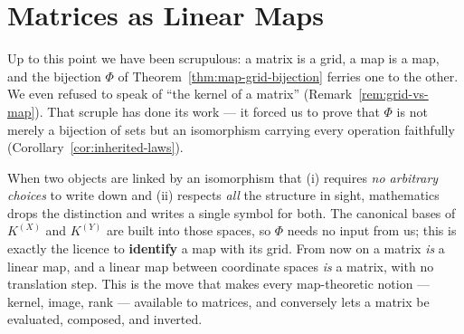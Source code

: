 
\newpage
\section{Matrices as Linear Maps}
\label{sec:matrices-as-maps}

\begin{intuition}
    Up to this point we have been scrupulous: a matrix is a grid, a map is a map, and the bijection
    $\Phi$ of Theorem~\ref{thm:map-grid-bijection} ferries one to the other. We even refused to speak of
    ``the kernel of a matrix'' (Remark~\ref{rem:grid-vs-map}). That scruple has done its work --- it
    forced us to prove that $\Phi$ is not merely a bijection of sets but an isomorphism carrying every
    operation faithfully (Corollary~\ref{cor:inherited-laws}).

    When two objects are linked by an isomorphism that (i) requires \emph{no arbitrary choices} to write
    down and (ii) respects \emph{all} the structure in sight, mathematics drops the distinction and
    writes a single symbol for both. The canonical bases of $K^{(X)}$ and $K^{(Y)}$ are built into those
    spaces, so $\Phi$ needs no input from us; this is exactly the licence to \textbf{identify} a map with
    its grid. From now on a matrix \emph{is} a linear map, and a linear map between coordinate spaces
    \emph{is} a matrix, with no translation step. This is the move that makes every map-theoretic notion
    --- kernel, image, rank --- available to matrices, and conversely lets a matrix be evaluated,
    composed, and inverted.
\end{intuition}

